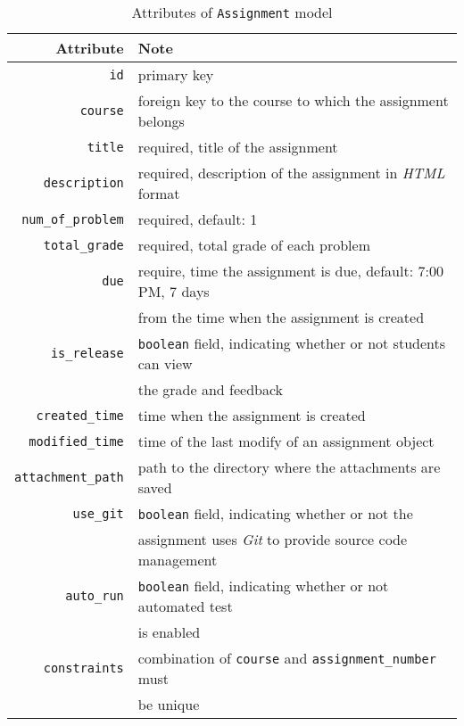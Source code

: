 \begin{table}[H]
    \centering
    \caption{Attributes of \texttt{Assignment} model}
    \label{tab:ASM_ATTR}
    \renewcommand{\arraystretch}{1.3}
    \begin{tabular}[H]{r|l}
        \hline
        Attribute & Note \\
        \hline
        \hline

        \texttt{id} & primary key \\
        \hline
        \texttt{course} & foreign key to the course to which the assignment
            belongs \\
        \hline
        \hline

        \texttt{title} & required, title of the assignment\\
        \hline
        \texttt{description} & required, description of the assignment 
            in \emph{HTML} format \\
        \hline
        \texttt{num\_of\_problem} & required, default: 1 \\
        \hline
        \texttt{total\_grade} & required, total grade of each problem \\
        \hline
        \texttt{due} & require, time the assignment is due, default: 7:00 PM, 7
            days \\ & from the time when the assignment is created \\
        \hline
        \texttt{is\_release} & \texttt{boolean} field, indicating whether or not
            students can view\\ & the grade and feedback \\
        \hline
        \texttt{created\_time} & time when the assignment is created \\
        \hline
        \texttt{modified\_time} & time of the last modify of an assignment
            object\\
        \hline
        \texttt{attachment\_path} & path to the directory where the attachments
            are saved \\
        \hline
        \hline

        \texttt{use\_git} & \texttt{boolean} field, indicating whether or not
            the \\ & assignment uses \emph{Git} to provide source code management \\
        \hline
        \texttt{auto\_run} & \texttt{boolean} field, indicating whether or not
            automated test \\ & is enabled \\
        \hline
        \hline

        \texttt{constraints} & combination of \texttt{course} and \texttt{assignment\_number}
            must \\ & be unique \\
        \hline
    \end{tabular}
    \renewcommand{\arraystretch}{1}
\end{table}

